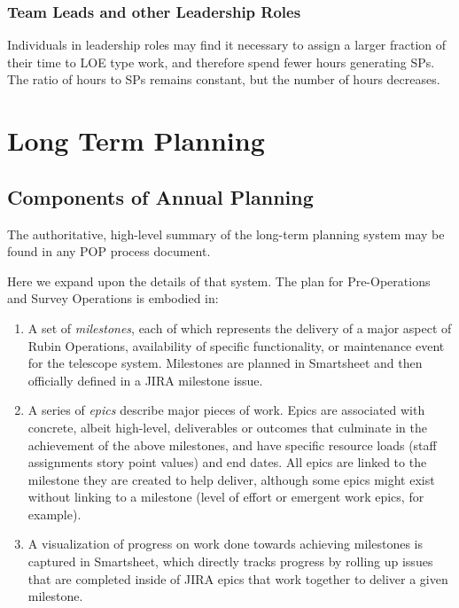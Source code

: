 \subsubsection{Team Leads and other Leadership Roles}

Individuals in leadership roles may find it necessary to assign a larger fraction of their time to \gls{LOE} type work, and therefore spend fewer hours generating \glspl{SP}.
The ratio of hours to \glspl{SP} remains constant, but the number of hours decreases.


\section{Long Term Planning}
\label{sec:long-term-plan}

\subsection{Components of Annual Planning}
\label{sec:annual-planning}
The authoritative, high-level summary of the long-term planning system may be found in any POP process document.

Here we expand upon the details of that system.
The plan for Pre-Operations and Survey Operations is embodied in:

\begin{enumerate}
    \item A set of \emph{milestones}, each of which represents the delivery of a major aspect of Rubin Operations, availability of specific functionality, or maintenance event for the telescope system.
        Milestones are planned in Smartsheet and then officially defined in a \gls{JIRA} milestone issue.
    \item A series of \emph{epics} describe major pieces of work.
        Epics are associated with concrete, albeit high-level, deliverables or outcomes that culminate in the achievement of the above milestones, and have specific resource loads (staff assignments story point values) and end dates.
        All epics are linked to the milestone they are created to help deliver, although some epics might exist without linking to a milestone (level of effort or emergent work epics, for example).
    \item A visualization of progress on work done towards achieving milestones is captured in Smartsheet, which directly tracks progress by rolling up issues that are completed inside of \gls{JIRA} epics that work together to deliver a given milestone.
\end{enumerate}

